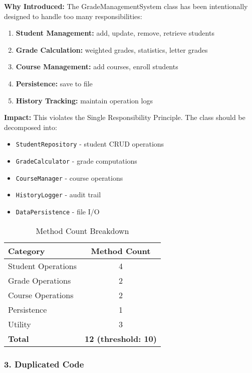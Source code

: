 \documentclass[11pt,a4paper]{article}
\begin{document}
\textbf{Why Introduced:} The GradeManagementSystem class has been intentionally designed to handle too many responsibilities:

\begin{enumerate}[noitemsep]
    \item \textbf{Student Management:} add, update, remove, retrieve students
    \item \textbf{Grade Calculation:} weighted grades, statistics, letter grades
    \item \textbf{Course Management:} add courses, enroll students
    \item \textbf{Persistence:} save to file
    \item \textbf{History Tracking:} maintain operation logs
\end{enumerate}

\textbf{Impact:} This violates the Single Responsibility Principle. The class should be decomposed into:

\begin{itemize}[noitemsep]
    \item \texttt{StudentRepository} - student CRUD operations
    \item \texttt{GradeCalculator} - grade computations
    \item \texttt{CourseManager} - course operations
    \item \texttt{HistoryLogger} - audit trail
    \item \texttt{DataPersistence} - file I/O
\end{itemize}

\begin{table}[h]
\centering
\caption{Method Count Breakdown}
\begin{tabular}{@{}lc@{}}
\toprule
\textbf{Category} & \textbf{Method Count} \\
\midrule
Student Operations & 4 \\
Grade Operations & 2 \\
Course Operations & 2 \\
Persistence & 1 \\
Utility & 3 \\
\midrule
\textbf{Total} & \textbf{12 (threshold: 10)} \\
\bottomrule
\end{tabular}
\end{table}

\subsubsection{3. Duplicated Code}
\end{document}
